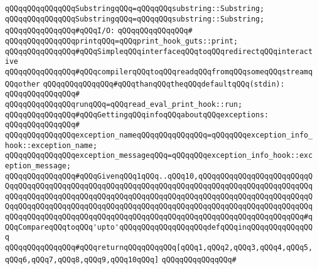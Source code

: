 \verb|qQQqqQQqqQQqqQQqSubstringqQQq=qQQqqQQqsubstring::Substring;|\newline
\verb|qQQqqQQqqQQqqQQqSubstringqQQq=qQQqqQQqsubstring::Substring;|\newline
\newline
\verb|qQQqqQQqqQQqqQQq#qQQqI/O:|\newline
\verb|qQQqqQQqqQQqqQQq#|\newline
\verb|qQQqqQQqqQQqqQQqprintqQQq=qQQqprint_hook_guts::print;|\newline
\newline
\verb|qQQqqQQqqQQqqQQq#qQQqSimpleqQQqinterfaceqQQqtoqQQqredirectqQQqinteractive|\newline
\verb|qQQqqQQqqQQqqQQq#qQQqcompilerqQQqtoqQQqreadqQQqfromqQQqsomeqQQqstreamqQQqother|\newline
\verb|qQQqqQQqqQQqqQQq#qQQqthanqQQqtheqQQqdefaultqQQq(stdin):|\newline
\verb|qQQqqQQqqQQqqQQq#|\newline
\verb|qQQqqQQqqQQqqQQqrunqQQq=qQQqread_eval_print_hook::run;|\newline
\newline
\verb|qQQqqQQqqQQqqQQq#qQQqGettingqQQqinfoqQQqaboutqQQqexceptions:|\newline
\verb|qQQqqQQqqQQqqQQq#|\newline
\verb|qQQqqQQqqQQqqQQqexception_nameqQQqqQQqqQQqqQQq=qQQqqQQqexception_info_hook::exception_name;|\newline
\verb|qQQqqQQqqQQqqQQqexception_messageqQQq=qQQqqQQqexception_info_hook::exception_message;|\newline
\newline
\newline
\verb|qQQqqQQqqQQqqQQq#qQQqGivenqQQq1qQQq..qQQq10,qQQqqQQqqQQqqQQqqQQqqQQqqQQqqQQqqQQqqQQqqQQqqQQqqQQqqQQqqQQqqQQqqQQqqQQqqQQqqQQqqQQqqQQqqQQqqQQqqQQqqQQqqQQqqQQqqQQqqQQqqQQqqQQqqQQqqQQqqQQqqQQqqQQqqQQqqQQqqQQqqQQqqQQqqQQqqQQqqQQqqQQqqQQqqQQqqQQqqQQqqQQqqQQqqQQqqQQqqQQqqQQqqQQqqQQqqQQqqQQqqQQqqQQqqQQqqQQqqQQqqQQqqQQqqQQqqQQqqQQqqQQqqQQqqQQqqQQqqQQqqQQq#qQQqCompareqQQqtoqQQq'upto'qQQqqQQqqQQqqQQqqQQqdefqQQqinqQQqqQQqqQQqqQQq|\newline
\verb|qQQqqQQqqQQqqQQq#qQQqreturnqQQqqQQqqQQq[qQQq1,qQQq2,qQQq3,qQQq4,qQQq5,qQQq6,qQQq7,qQQq8,qQQq9,qQQq10qQQq]|\newline
\verb|qQQqqQQqqQQqqQQq#|\newline
